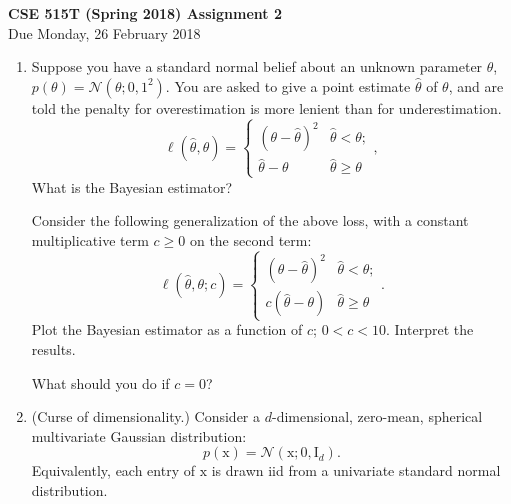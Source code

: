 \documentclass{article}
\newcommand{\mc}[1]{\mathcal{#1}}
\newcommand{\mat}[1]{\bm{\mathrm{#1}}}
\renewcommand{\vec}[1]{\bm{\mathrm{#1}}}
\begin{document}
{\large \textbf{CSE 515T (Spring 2018) Assignment 2}} \\
Due Monday, 26 February 2018 \\

\begin{enumerate}


\item

  Suppose you have a standard normal belief about an unknown parameter
  $\theta$, $p(\theta) = \mc{N}(\theta; 0, 1^2)$.  You are asked to
  give a point estimate $\hat{\theta}$ of $\theta$, and are told the
  penalty for overestimation is more lenient than for
  underestimation.
  \begin{equation*}
    \ell(\hat{\theta}, \theta)
    =
    \begin{cases}
      (\theta - \hat{\theta})^2 & \hat{\theta}  <   \theta; \\
      \hat{\theta} - \theta     & \hat{\theta} \geq \theta
    \end{cases},
  \end{equation*}
  What is the Bayesian estimator?

  Consider the following generalization of the above loss, with a constant
  multiplicative term $c \geq 0$ on the second term:
  \begin{equation*}
    \ell(\hat{\theta}, \theta; c)
    =
    \begin{cases}
      (\theta - \hat{\theta})^2 & \hat{\theta}  <   \theta; \\
      c(\hat{\theta} - \theta)     & \hat{\theta} \geq \theta
    \end{cases}.
  \end{equation*}
  Plot the Bayesian estimator as a function of $c$; $0 < c < 10$.
  Interpret the results.

  What should you do if $c = 0$?

\item
  (Curse of dimensionality.)
  Consider a $d$-dimensional, zero-mean, spherical multivariate
  Gaussian distribution:
  \begin{equation*}
    p(\vec{x}) = \mc{N}(\vec{x}; \vec{0}, \mat{I}_d).
  \end{equation*}
  Equivalently, each entry of $\vec{x}$ is drawn iid from a univariate
  standard normal distribution.


\end{enumerate}
\end{document}
